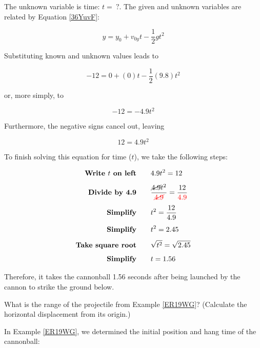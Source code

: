 \documentclass[main-physics.tex]{subfiles}
\begin{document}
The unknown variable is time: $t =\ ?$. The given and unknown variables are related by Equation \eqref{36YuvF}:

\begin{equation*}
    y = y_0 + v_{0y}t - \frac{1}{2}  g t^2 
\end{equation*}

Substituting known and unknown values leads to

\begin{equation*}
    -12 = 0 + (0) t - \frac{1}{2} (9.8) t^2
\end{equation*}

or, more simply, to

\begin{equation*}
    -12 = -4.9 t^2
\end{equation*}

Furthermore, the negative signs cancel out, leaving

\begin{equation*}
    12 = 4.9 t^2
\end{equation*}

To finish solving this equation for time ($t$), we take the following steps:

\begin{align*}
    \textbf{Write $t$ on left} \qquad & 4.9 t^2 = 12\\[1ex]
    \textbf{Divide by 4.9} \qquad & \frac{\cancel{4.9} t^2}{\textcolor{red}{\cancel{4.9}}} = \frac{12}{\textcolor{red}{4.9}}\\[1ex]
    \textbf{Simplify} \qquad & t^2 = \frac{12}{4.9}\\[1ex]
    \textbf{Simplify} \qquad & t^2 = 2.45\\[1ex]
    \textbf{Take square root} \qquad & \sqrt{t^2} = \sqrt{2.45}\\[1ex]
    \textbf{Simplify} \qquad & t = 1.56
\end{align*}

Therefore, it takes the cannonball 1.56 seconds after being launched by the cannon to strike the ground below. 

\endsolution

\begin{example} \label{jKndVF}
    What is the range of the projectile from Example \ref{ER19WG}? (Calculate the horizontal displacement from its origin.)
\end{example}

\Solution In Example \ref{ER19WG}, we determined the initial position and hang time of the cannonball:
\end{document}
